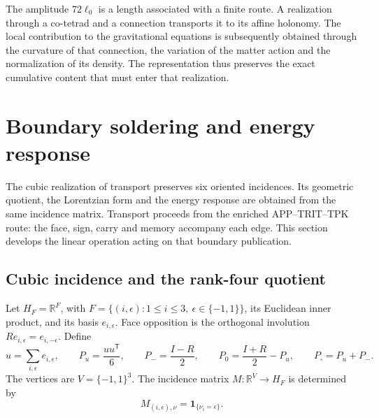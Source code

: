 The amplitude \(72\ell_0\) is a length associated with a finite route.
A realization through a co-tetrad and a connection transports it to its
affine holonomy. The local contribution to the gravitational equations
is subsequently obtained through the curvature of that connection, the
variation of the matter action and the normalization of its density.
The representation thus preserves the exact cumulative content that
must enter that realization.




\chapter{Boundary soldering and energy response}
\label{x_reciprocidad:vii:sec:pantalla-respuesta}

The cubic realization of transport preserves six oriented incidences.
Its geometric quotient, the Lorentzian form and the energy response
are obtained from the same incidence matrix. Transport proceeds from
the enriched APP--TRIT--TPK route: the face, sign, carry and
memory accompany each edge. This section develops the
linear operation acting on that boundary publication.

\section{Cubic incidence and the rank-four quotient}
\label{x_reciprocidad:vii:sec:cociente-pantalla}

Let \(H_F=\mathbb R^F\), with
\(F=\{(i,\epsilon):1\leq i\leq3,\ \epsilon\in\{-1,1\}\}\),
its Euclidean inner product, and its basis \(e_{i,\epsilon}\).
Face opposition is the orthogonal involution
\(Re_{i,\epsilon}=e_{i,-\epsilon}\). Define
\[
 u=\sum_{i,\epsilon}e_{i,\epsilon},\qquad
 P_u=\frac{uu^{\mathsf T}}6,\qquad P_-=\frac{I-R}{2},\qquad
 P_0=\frac{I+R}{2}-P_u,\qquad P_\square=P_u+P_-.
\]
The vertices are \(V=\{-1,1\}^3\). The incidence matrix
\(M:\mathbb R^V\longrightarrow H_F\) is determined by
\[
 M_{(i,\epsilon),\nu}=\mathbf1_{\{\nu_i=\epsilon\}}.
\]

